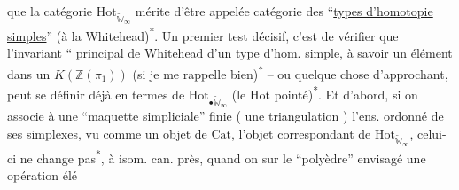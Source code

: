 que la catégorie $\mathrm{Hot}_{\widetilde{\mathbb W}_\infty}$ mérite d'être appelée catégorie des ``\uline{types d'homotopie simples}'' (à la Whitehead)\textsuperscript{*}.%
 Un premier test décisif, c'est de vérifier que l'invariant `` principal de Whitehead d'un type d'hom. simple, à savoir un élément dans un $K(\mathbb Z(\pi_1))$ (si je me rappelle bien)\textsuperscript{*} -- ou quelque
 chose d'approchant, peut se définir déjà en termes  de $\mathrm{Hot}_{\bullet\widetilde{\mathbb W}_\infty}$ (le $\mathrm{Hot}$ pointé)\textsuperscript{*}. Et d'abord, si on associe à une  ``maquette simpliciale'' finie (  une triangulation ) l'ens. ordonné de ses simplexes, vu comme un objet de $\mathrm{Cat}$, l'objet correspondant de $\mathrm{Hot}_{\widetilde{\mathbb W}_\infty}$, celui-ci ne change pas\textsuperscript{*}, à
 isom. can. près, quand on   sur  le ``polyèdre'' envisagé une opération élé%
